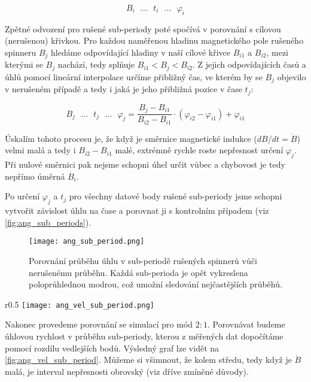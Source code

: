 $$
    B_i \text{ } \ldots \text{ } t_i \text{ } \ldots \text{ } \varphi_i
$$

Zpětné odvození pro rušené sub-periody poté spočívá v porovnání s cílovou (nerušenou) křivkou. Pro každou naměřenou hladinu magnetického pole rušeného spinneru $B_j$ hledáme odpovídající hladiny v naší cílové křivce $B_{i1}$ a $B_{i2}$, mezi kterými se $B_j$ nachází, tedy splňuje $B_{i1} < B_j < B_{i2}$. Z jejich odpovídajících časů a úhlů pomocí lineární interpolace určíme přibližný čas, ve kterém by se $B_j$ objevilo v nerušeném případě a tedy i jaká je jeho přibližná pozice v čase $t_j$:

$$
    B_j \text{ } \ldots \text{ } t_j \text{ } \ldots \text{ } \varphi_j = \frac{B_j - B_{i1}}{B_{i2} - B_{i1}} \cdot (\varphi_{i2} - \varphi_{i1}) + \varphi_{i1}
$$

Úskalím tohoto procesu je, že když je směrnice magnetické indukce ($dB/dt = \dot{B}$) velmi malá a tedy i $B_{i2} - B_{i1}$ malé, extrémně rychle roste nepřesnost určení $\varphi_j$. Při nulové směrnici pak nejsme schopni úhel určit vůbec a chybovost je tedy nepřímo úměrná $\dot{B_i}$.

Po určení $\varphi_j$ a $t_j$ pro všechny datové body rušené sub-periody jsme schopni vytvořit závislost úhlu na čase a porovnat ji s kontrolním případem (viz \autoref{fig:ang_sub_periods}). 

\clearpage

\begin{figure}[H]
    \texttt{[image: ang\_sub\_period.png]}
    \centering
    \caption[Porovnání průběhu úhlu v sub-periodě rušených spinnerů vůči nerušenému průběhu]{Porovnání průběhu úhlu v sub-periodě rušených spinnerů vůči nerušenému průběhu. Každá sub-perioda je opět vykreslena poloprůhlednou modrou, což umožní sledování nejčastějších průběhů.}
    \label{fig:ang_sub_periods}
\end{figure}

\begin{wrapfigure}{r}{0.5\textwidth}
    \texttt{[image: ang\_vel\_sub\_period.png]}
    \centering
    \caption{Porovnání měřeného a simulovaného průběhu úhlové rychlosti v čase pro mód $2:1$}
    \label{fig:ang_vel_sub_period}
\end{wrapfigure}

Nakonec provedeme porovnání se simulací pro mód $2:1$. Porovnávat budeme úhlovou rychlost v průběhu sub-periody, kterou z měřených dat dopočítáme pomocí rozdílu vedlejších bodů. Výsledný graf lze vidět na \ref{fig:ang_vel_sub_period}. Můžeme si všimnout, že kolem středu, tedy když je $\dot{B}$ malá, je interval nepřesnosti obrovský (viz dříve zmíněné důvody).

